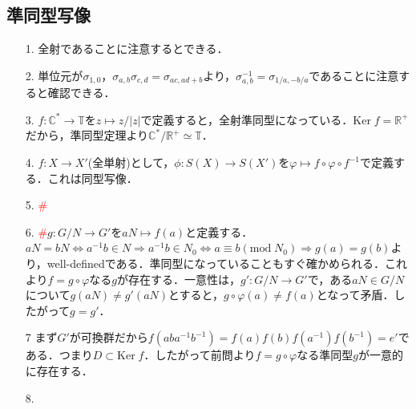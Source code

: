 \documentclass[a4paper,10pt,uplatex]{jsarticle}
\newcommand{\miss}{\textcolor{red}{\#}}
\newcommand{\R}{\mathbb{R}}
\newcommand{\C}{\mathbb{C}}
\newcommand{\T}{\mathbb{T}}
\newcommand{\Mod}{\text{mod}\;}
\newcommand{\Ker}{\text{Ker}\;}
\numberwithin{equation}{section}
\theoremstyle{mystyle}
\begin{document}
\subsection{準同型写像}
\begin{itemize}
    \item[1.] 全射であることに注意するとできる．
    \item[2.] 単位元が$\sigma_{1,0}$，$\sigma_{a,b}\sigma_{c,d}=\sigma_{ac,ad+b}$より，$\sigma_{a,b}^{-1} = \sigma_{1/a,-b/a}$であることに注意すると確認できる．
    \item[3.] $f:\C^* \to \T$を$z \mapsto z/|z|$で定義すると，全射準同型になっている．$\Ker f = \R^+$だから，準同型定理より$\C^* / \R^+ \simeq \T$．
    \item[4.] $f:X \to X'$(全単射)として，$\phi:S(X) \to S(X')$を$\varphi \mapsto f \circ \varphi \circ f^{-1}$で定義する．これは同型写像．
    \item[5.] \miss
    \item[6.] \miss $g:G/N \to G'$を$aN \mapsto f(a)$と定義する．$aN = bN \Leftrightarrow a^{-1}b \in N \Rightarrow a^{-1}b \in N_0 \Leftrightarrow a \equiv b(\Mod N_0) \Rightarrow g(a) = g(b)$より，well-definedである．準同型になっていることもすぐ確かめられる．これより$f = g \circ \varphi$なる$g$が存在する．一意性は，$g':G/N \to G'$で，ある$aN \in G/N$について$g(aN) \neq g'(aN)$とすると，$g \circ \varphi(a) \neq f(a)$となって矛盾．したがって$g = g'$．
    \item[7] まず$G'$が可換群だから$f(aba^{-1}b^{-1}) = f(a)f(b)f(a^{-1})f(b^{-1}) = e'$である．つまり$D \subset \Ker f$．したがって前問より$f = g \circ \varphi$なる準同型$g$が一意的に存在する．
    \item[8.] 
\end{itemize}
\end{document}

